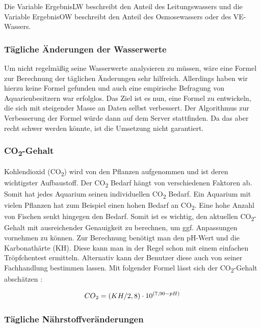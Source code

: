 Die Variable ErgebnisLW beschreibt den Anteil des Leitungswassers und die Variable ErgebnisOW beschreibt den Anteil des Osmosewassers oder des VE-Wassers.

\subsubsection{Tägliche Änderungen der Wasserwerte}

Um nicht regelmäßig seine Wasserwerte analysieren zu müssen, wäre eine Formel zur Berechnung der täglichen Änderungen sehr hilfreich. Allerdings haben wir hierzu keine Formel gefunden und auch eine empirische Befragung von Aquarienbesitzern war erfolglos. Das Ziel ist es nun, eine Formel zu entwickeln, die sich mit steigender Masse an Daten selbst verbessert. Der Algorithmus zur Verbesserung der Formel würde dann auf dem Server stattfinden. Da das aber recht schwer werden könnte, ist die Umsetzung nicht garantiert.

\subsubsection{CO\textsubscript{2}-Gehalt}

Kohlendioxid (CO\textsubscript{2}) wird von den Pflanzen aufgenommen und ist deren wichtigster Aufbaustoff. Der CO\textsubscript{2} Bedarf hängt von verschiedenen Faktoren ab. Somit hat jedes Aquarium seinen individuellen CO\textsubscript{2} Bedarf. Ein Aquarium mit vielen Pflanzen hat zum Beispiel einen hohen Bedarf an CO\textsubscript{2}. Eine hohe Anzahl von Fischen senkt hingegen den Bedarf. Somit ist es wichtig, den aktuellen CO\textsubscript{2}-Gehalt mit ausreichender Genauigkeit zu berechnen, um ggf. Anpassungen vornehmen zu können. Zur Berechnung benötigt man den pH-Wert und die Karbonathärte (KH). Diese kann man in der Regel schon mit einem einfachen Tröpfchentest ermitteln. Alternativ kann der Benutzer diese auch von seiner Fachhandlung bestimmen lassen. Mit folgender Formel lässt sich der CO\textsubscript{2}-Gehalt abschätzen \autocite{Formel:CO2}:

\begin{equation}
CO\textsubscript{2} = (KH/2,8)\cdot10^{(7,90-pH)}
\end{equation}

\subsubsection{Tägliche Nährstoffveränderungen}

